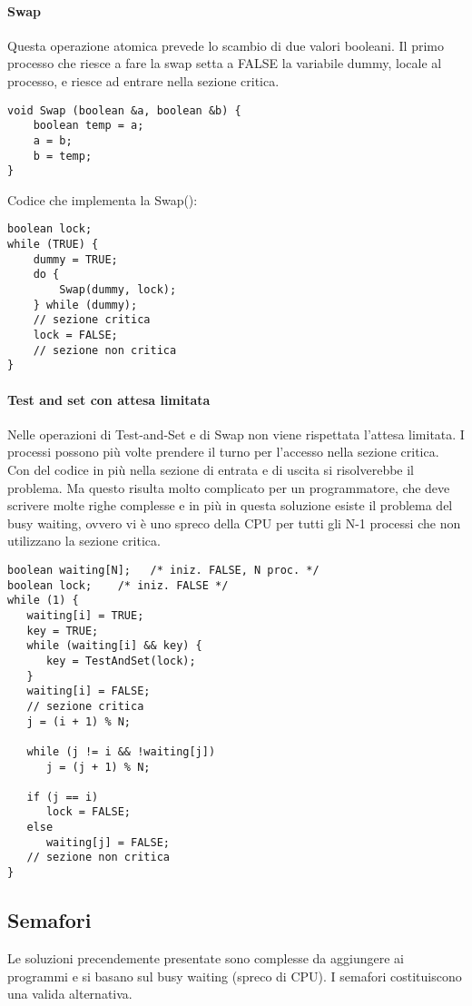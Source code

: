\documentclass[a4]{article}
\begin{document}
\paragraph{Swap}
Questa operazione atomica prevede lo scambio di due valori booleani. Il primo processo che riesce a fare la swap setta a FALSE la variabile dummy, locale al processo, e riesce ad entrare nella sezione critica.
\begin{verbatim}
void Swap (boolean &a, boolean &b) {
    boolean temp = a;
    a = b;
    b = temp;
}
\end{verbatim}
Codice che implementa la Swap():
\begin{verbatim}
boolean lock;
while (TRUE) {
    dummy = TRUE;
    do {
        Swap(dummy, lock);
    } while (dummy);
    // sezione critica
    lock = FALSE;
    // sezione non critica
}
\end{verbatim}

\paragraph{Test and set con attesa limitata}
Nelle operazioni di Test-and-Set e di Swap non viene rispettata l’attesa limitata. I processi possono più volte prendere il turno per l’accesso nella sezione critica. Con del codice in più nella sezione di entrata e di uscita si risolverebbe il problema. Ma questo risulta molto complicato per un programmatore, che deve scrivere molte righe complesse e in più in questa soluzione esiste il problema del busy waiting, ovvero vi è uno spreco della CPU per tutti gli N-1 processi che non utilizzano la sezione critica.
\begin{verbatim}
boolean waiting[N];   /* iniz. FALSE, N proc. */
boolean lock;    /* iniz. FALSE */
while (1) {
   waiting[i] = TRUE;
   key = TRUE;
   while (waiting[i] && key) {
      key = TestAndSet(lock);
   }
   waiting[i] = FALSE;
   // sezione critica
   j = (i + 1) % N;
   
   while (j != i && !waiting[j])
      j = (j + 1) % N;
   
   if (j == i) 
      lock = FALSE;
   else
      waiting[j] = FALSE;
   // sezione non critica
}
\end{verbatim}

\subsection{Semafori}
Le soluzioni precendemente presentate sono complesse da aggiungere ai programmi e si basano sul busy waiting (spreco di CPU). I semafori costituiscono una valida alternativa.
\end{document}
